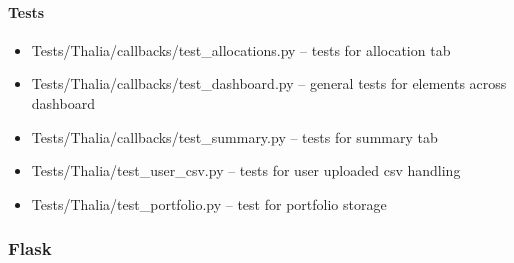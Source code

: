 \documentclass[main.tex]{subfiles}
\begin{document}
\paragraph{Tests}\label{tests-3}

\begin{itemize}

\item
  Tests/Thalia/callbacks/test\_allocations.py -- tests for allocation
  tab
\item
  Tests/Thalia/callbacks/test\_dashboard.py -- general tests for
  elements across dashboard
\item
  Tests/Thalia/callbacks/test\_summary.py -- tests for summary tab
\item
  Tests/Thalia/test\_user\_csv.py -- tests for user uploaded csv
  handling
\item
  Tests/Thalia/test\_portfolio.py -- test for portfolio storage
\end{itemize}


\subsubsection{Flask}\label{flask}
\end{document}
